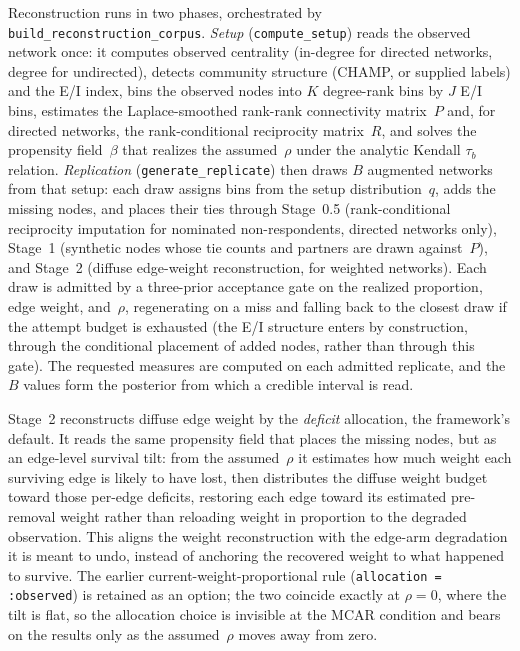 \documentclass[11pt]{article}
\newcommand{\Pmat}{P}
\newcommand{\Rmat}{R}
\begin{document}
Reconstruction runs in two phases, orchestrated by \texttt{build\_reconstruction\_corpus}. \emph{Setup} (\texttt{compute\_setup}) reads the observed network once: it computes observed centrality (in-degree for directed networks, degree for undirected), detects community structure (CHAMP, or supplied labels) and the E/I index, bins the observed nodes into $K$ degree-rank bins by $J$ E/I bins, estimates the Laplace-smoothed rank-rank connectivity matrix~$\Pmat$ and, for directed networks, the rank-conditional reciprocity matrix~$\Rmat$, and solves the propensity field~$\beta$ that realizes the assumed~$\rho$ under the analytic Kendall $\tau_b$ relation. \emph{Replication} (\texttt{generate\_replicate}) then draws $B$ augmented networks from that setup: each draw assigns bins from the setup distribution~$q$, adds the missing nodes, and places their ties through Stage~0.5 (rank-conditional reciprocity imputation for nominated non-respondents, directed networks only), Stage~1 (synthetic nodes whose tie counts and partners are drawn against~$\Pmat$), and Stage~2 (diffuse edge-weight reconstruction, for weighted networks). Each draw is admitted by a three-prior acceptance gate on the realized proportion, edge weight, and~$\rho$, regenerating on a miss and falling back to the closest draw if the attempt budget is exhausted (the E/I structure enters by construction, through the conditional placement of added nodes, rather than through this gate). The requested measures are computed on each admitted replicate, and the $B$ values form the posterior from which a credible interval is read.

Stage~2 reconstructs diffuse edge weight by the \emph{deficit} allocation, the framework's default. It reads the same propensity field that places the missing nodes, but as an edge-level survival tilt: from the assumed~$\rho$ it estimates how much weight each surviving edge is likely to have lost, then distributes the diffuse weight budget toward those per-edge deficits, restoring each edge toward its estimated pre-removal weight rather than reloading weight in proportion to the degraded observation. This aligns the weight reconstruction with the edge-arm degradation it is meant to undo, instead of anchoring the recovered weight to what happened to survive. The earlier current-weight-proportional rule (\texttt{allocation = :observed}) is retained as an option; the two coincide exactly at $\rho = 0$, where the tilt is flat, so the allocation choice is invisible at the MCAR condition and bears on the results only as the assumed~$\rho$ moves away from zero.
\end{document}
